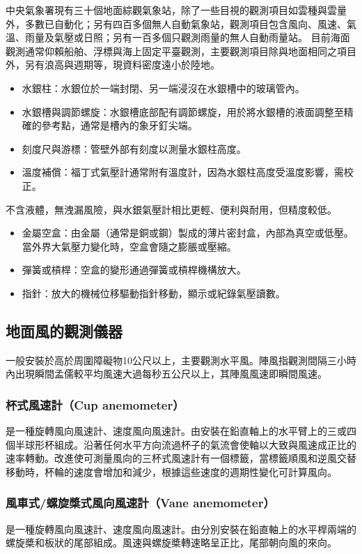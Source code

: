 \documentclass[a4paper,12pt]{report}
\begin{document}
\begin{itemize}
中央氣象署現有三十個地面綜觀氣象站，除了一些目視的觀測項目如雲種與雲量外，多數已自動化；另有四百多個無人自動氣象站，觀測項目包含風向、風速、氣溫、雨量及氣壓或日照；另有一百多個只觀測雨量的無人自動雨量站。
目前海面觀測通常仰賴船舶、浮標與海上固定平臺觀測，主要觀測項目除與地面相同之項目外，另有浪高與週期等，現資料密度遠小於陸地。
\begin{itemize}
\item 水銀柱：水銀位於一端封閉、另一端浸沒在水銀槽中的玻璃管內。
\item 水銀槽與調節螺旋：水銀槽底部配有調節螺旋，用於將水銀槽的液面調整至精確的參考點，通常是槽內的象牙釘尖端。
\item 刻度尺與游標：管壁外部有刻度以測量水銀柱高度。
\item 溫度補償：福丁式氣壓計通常附有溫度計，因為水銀柱高度受溫度影響，需校正。
\end{itemize}
不含液體，無洩漏風險，與水銀氣壓計相比更輕、便利與耐用，但精度較低。
\begin{itemize}
\item 金屬空盒：由金屬（通常是銅或鋼）製成的薄片密封盒，內部為真空或低壓。當外界大氣壓力變化時，空盒會隨之膨脹或壓縮。
\item 彈簧或槓桿：空盒的變形通過彈簧或槓桿機構放大。
\item 指針：放大的機械位移驅動指針移動，顯示或紀錄氣壓讀數。
\end{itemize}
\subsection{地面風的觀測儀器}
一般安裝於高於周圍障礙物10公尺以上，主要觀測水平風。陣風指觀測間隔三小時內出現瞬間孟儒較平均風速大過每秒五公尺以上，其陣風風速即瞬間風速。
\subsubsection{杯式風速計（Cup anemometer）}
是一種旋轉風向風速計、速度風向風速計。由安裝在鉛直軸上的水平臂上的三或四個半球形杯組成。沿著任何水平方向流過杯子的氣流會使軸以大致與風速成正比的速率轉動。改進使可測量風向的三杯式風速計有一個標籤，當標籤順風和逆風交替移動時，杯輪的速度會增加和減少，根據這些速度的週期性變化可計算風向。
\subsubsection{風車式/螺旋槳式風向風速計（Vane anemometer）}
是一種旋轉風向風速計、速度風向風速計。由分別安裝在鉛直軸上的水平桿兩端的螺旋槳和板狀的尾部組成。風速與螺旋槳轉速略呈正比，尾部朝向風的來向。

\end{itemize}
\end{document}
